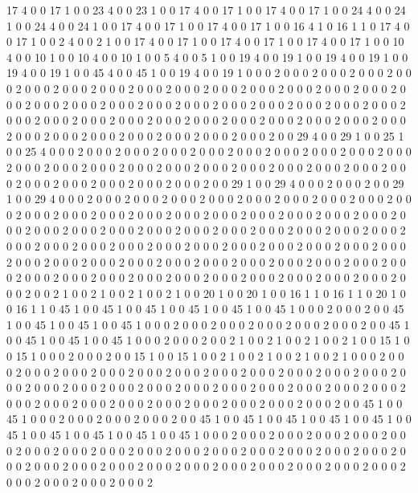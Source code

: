 17
4
0
0
17
1
0
0
23
4
0
0
23
1
0
0
17
4
0
0
17
1
0
0
17
4
0
0
17
1
0
0
24
4
0
0
24
1
0
0
24
4
0
0
24
1
0
0
17
4
0
0
17
1
0
0
17
4
0
0
17
1
0
0
16
4
1
0
16
1
1
0
17
4
0
0
17
1
0
0
2
4
0
0
2
1
0
0
17
4
0
0
17
1
0
0
17
4
0
0
17
1
0
0
17
4
0
0
17
1
0
0
10
4
0
0
10
1
0
0
10
4
0
0
10
1
0
0
5
4
0
0
5
1
0
0
19
4
0
0
19
1
0
0
19
4
0
0
19
1
0
0
19
4
0
0
19
1
0
0
45
4
0
0
45
1
0
0
19
4
0
0
19
1
0
0
0
2
0
0
0
2
0
0
0
2
0
0
0
2
0
0
0
2
0
0
0
2
0
0
0
2
0
0
0
2
0
0
0
2
0
0
0
2
0
0
0
2
0
0
0
2
0
0
0
2
0
0
0
2
0
0
0
2
0
0
0
2
0
0
0
2
0
0
0
2
0
0
0
2
0
0
0
2
0
0
0
2
0
0
0
2
0
0
0
2
0
0
0
2
0
0
0
2
0
0
0
2
0
0
0
2
0
0
0
2
0
0
0
2
0
0
0
2
0
0
0
2
0
0
0
2
0
0
0
2
0
0
0
2
0
0
0
2
0
0
0
2
0
0
0
2
0
0
0
2
0
0
0
2
0
0
0
2
0
0
0
2
0
0
0
2
0
0
0
2
0
0
0
2
0
0
29
4
0
0
29
1
0
0
25
1
0
0
25
4
0
0
0
2
0
0
0
2
0
0
0
2
0
0
0
2
0
0
0
2
0
0
0
2
0
0
0
2
0
0
0
2
0
0
0
2
0
0
0
2
0
0
0
2
0
0
0
2
0
0
0
2
0
0
0
2
0
0
0
2
0
0
0
2
0
0
0
2
0
0
0
2
0
0
0
2
0
0
0
2
0
0
0
2
0
0
0
2
0
0
0
2
0
0
0
2
0
0
0
2
0
0
0
2
0
0
29
1
0
0
29
4
0
0
0
2
0
0
0
2
0
0
29
1
0
0
29
4
0
0
0
2
0
0
0
2
0
0
0
2
0
0
0
2
0
0
0
2
0
0
0
2
0
0
0
2
0
0
0
2
0
0
0
2
0
0
0
2
0
0
0
2
0
0
0
2
0
0
0
2
0
0
0
2
0
0
0
2
0
0
0
2
0
0
0
2
0
0
0
2
0
0
0
2
0
0
0
2
0
0
0
2
0
0
0
2
0
0
0
2
0
0
0
2
0
0
0
2
0
0
0
2
0
0
0
2
0
0
0
2
0
0
0
2
0
0
0
2
0
0
0
2
0
0
0
2
0
0
0
2
0
0
0
2
0
0
0
2
0
0
0
2
0
0
0
2
0
0
0
2
0
0
0
2
0
0
0
2
0
0
0
2
0
0
0
2
0
0
0
2
0
0
0
2
0
0
0
2
0
0
0
2
0
0
0
2
0
0
0
2
0
0
0
2
0
0
0
2
0
0
0
2
0
0
0
2
0
0
0
2
0
0
0
2
0
0
0
2
0
0
0
2
0
0
0
2
0
0
0
2
0
0
0
2
0
0
0
2
0
0
0
2
0
0
0
2
0
0
0
2
0
0
0
2
0
0
2
1
0
0
2
1
0
0
2
1
0
0
2
1
0
0
20
1
0
0
20
1
0
0
16
1
1
0
16
1
1
0
20
1
0
0
16
1
1
0
45
1
0
0
45
1
0
0
45
1
0
0
45
1
0
0
45
1
0
0
45
1
0
0
0
2
0
0
0
2
0
0
45
1
0
0
45
1
0
0
45
1
0
0
45
1
0
0
0
2
0
0
0
2
0
0
0
2
0
0
0
2
0
0
0
2
0
0
0
2
0
0
45
1
0
0
45
1
0
0
45
1
0
0
45
1
0
0
0
2
0
0
0
2
0
0
2
1
0
0
2
1
0
0
2
1
0
0
2
1
0
0
15
1
0
0
15
1
0
0
0
2
0
0
0
2
0
0
15
1
0
0
15
1
0
0
2
1
0
0
2
1
0
0
2
1
0
0
2
1
0
0
0
2
0
0
0
2
0
0
0
2
0
0
0
2
0
0
0
2
0
0
0
2
0
0
0
2
0
0
0
2
0
0
0
2
0
0
0
2
0
0
0
2
0
0
0
2
0
0
0
2
0
0
0
2
0
0
0
2
0
0
0
2
0
0
0
2
0
0
0
2
0
0
0
2
0
0
0
2
0
0
0
2
0
0
0
2
0
0
0
2
0
0
0
2
0
0
0
2
0
0
0
2
0
0
0
2
0
0
0
2
0
0
0
2
0
0
0
2
0
0
0
2
0
0
0
2
0
0
45
1
0
0
45
1
0
0
0
2
0
0
0
2
0
0
0
2
0
0
0
2
0
0
45
1
0
0
45
1
0
0
45
1
0
0
45
1
0
0
45
1
0
0
45
1
0
0
45
1
0
0
45
1
0
0
45
1
0
0
45
1
0
0
0
2
0
0
0
2
0
0
0
2
0
0
0
2
0
0
0
2
0
0
0
2
0
0
0
2
0
0
0
2
0
0
0
2
0
0
0
2
0
0
0
2
0
0
0
2
0
0
0
2
0
0
0
2
0
0
0
2
0
0
0
2
0
0
0
2
0
0
0
2
0
0
0
2
0
0
0
2
0
0
0
2
0
0
0
2
0
0
0
2
0
0
0
2
0
0
0
2
0
0
0
2
0
0
0
2
0
0
0
2
0
0
0
2
0
0
0
2
0
0
0
2
